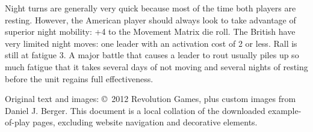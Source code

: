 \documentclass[11pt]{article}
\begin{document}
Night turns are generally very quick because most of the time both players are resting. However, the American player should always look to take advantage of superior night mobility: +4 to the Movement Matrix die roll. The British have very limited night moves: one leader with an activation cost of 2 or less. Rall is still at fatigue 3. A major battle that causes a leader to rout usually piles up so much fatigue that it takes several days of not moving and several nights of resting before the unit regains full effectiveness.

\vfill
\begin{center}
\small Original text and images: \copyright\ 2012 Revolution Games, plus custom images from Daniel J. Berger. This document is a local collation of the downloaded example-of-play pages, excluding website navigation and decorative elements.
\end{center}
\end{document}
